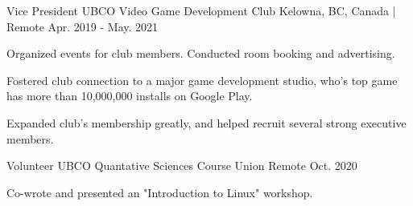 

\begin{cventries}

  \cventry
    {Vice President} %
    {UBCO Video Game Development Club} %
    {Kelowna, BC, Canada | Remote} %
    {Apr. 2019 - May. 2021} %
    {
      \begin{cvitems} %
        \item 
        {
            Organized events for club members. Conducted room booking and 
            advertising.
        }
        \item 
        {
            Fostered club connection to a major game development studio, who's 
            top game has more than 10,000,000 installs on Google Play.
        }
        \item
        {
            Expanded club's membership greatly, and helped recruit several 
            strong executive members.
        }
      \end{cvitems}
    }

  \cventry
    {Volunteer} %
    {UBCO Quantative Sciences Course Union} %
    {Remote} %
    {Oct. 2020} %
    {
      \begin{cvitems} %
        \item 
        {
            Co-wrote and presented an "Introduction to Linux" workshop.
        }
      \end{cvitems}
    }

\end{cventries}
